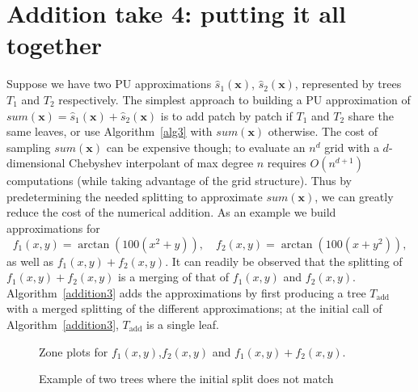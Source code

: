 \documentclass{article}
\newcommand{\vect}[1]{\mathbf{#1}}
\begin{document}
\section{Addition take 4: putting it all together}

Suppose we have two PU approximations $\hat{s}_1(\vect{x})$, $\hat{s}_2(\vect{x})$, represented by trees $T_1$ and $T_2$ respectively. The simplest approach to building a PU approximation of $sum(\vect{x})=\hat{s}_1(\vect{x})+\hat{s}_2(\vect{x})$ is to add patch by patch if $T_1$ and $T_2$ share the same leaves, or use Algorithm~\ref{alg3} with $sum(\vect{x})$ otherwise. The cost of sampling $sum(\vect{x})$ can be expensive though; to evaluate an $n^{d}$ grid with a $d$-dimensional Chebyshev interpolant of max degree $n$ requires $O(n^{d+1})$ computations (while taking advantage of the grid structure). Thus by predetermining the needed splitting to approximate $sum(\vect{x})$, we can greatly reduce the cost of the numerical addition. As an example we build approximations for
\begin{equation}
f_1(x,y) = \arctan(100(x^2+y)), \quad f_2(x,y) = \arctan(100(x+y^2)),
\end{equation}
as well as $f_1(x,y)+f_2(x,y)$. It can readily be observed that the splitting of $f_1(x,y)+f_2(x,y)$ is a merging of that of $f_1(x,y)$ and $f_2(x,y)$. Algorithm~\ref{addition3} adds the approximations by first producing a tree $T_{\text{add}}$ with a merged splitting of the different approximations; at the initial call of Algorithm~\ref{addition3}, $T_{\text{add}}$ is a single leaf.


\begin{figure}[!htb]
\centering
{}
 
 \caption{Zone plots for $f_1(x,y)$,$f_2(x,y)$ and $f_1(x,y)+f_2(x,y)$.}
\label{zone_tan}
\end{figure}
 
 \begin{figure}[!htb]
\centering
{}
\caption{Example of two trees where the initial split does not match}
\label{bad_split}
\end{figure}
\end{document}
